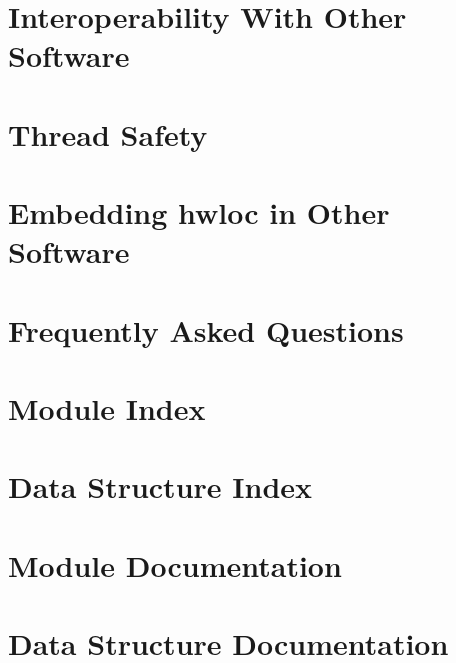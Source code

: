 \documentclass[letterpaper]{book}
\begin{document}
\chapter{Interoperability With Other Software}
\label{interoperability}
\hypertarget{interoperability}{}

\chapter{Thread Safety}
\label{threadsafety}
\hypertarget{threadsafety}{}

\chapter{Embedding hwloc in Other Software}
\label{embed}
\hypertarget{embed}{}

\chapter{Frequently Asked Questions}
\label{faq}
\hypertarget{faq}{}

\chapter{Module Index}

\chapter{Data Structure Index}

\chapter{Module Documentation}





































\chapter{Data Structure Documentation}















\printindex
\end{document}
